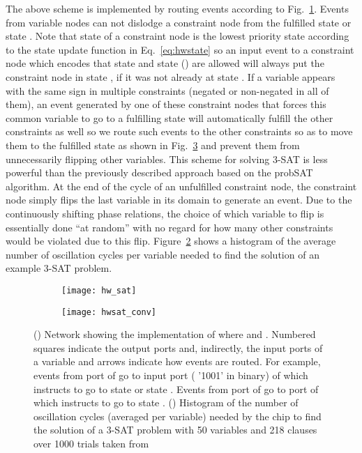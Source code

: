 \documentclass[10pt]{article}
\begin{document}
The above scheme is implemented by routing events according to Fig.~\ref{fig:hwsat_a}. Events from variable nodes can not dislodge a constraint node from the fulfilled state or state . Note that state  of a constraint node is the lowest priority state according to the state update function in Eq.~\ref{eq:hwstate} so an input event to a constraint node which encodes that state  and state  () are allowed will always put the constraint node in state , if it was not already at state . If a variable appears with the same sign in multiple constraints (negated or non-negated in all of them), an event generated by one of these constraint nodes that forces this common variable to go to a fulfilling state will automatically fulfill the other constraints as well so we route such events to the other constraints so as to move them to the fulfilled state as shown in Fig.~\ref{fig:hwsat} and prevent them from unnecessarily flipping other variables. This scheme for solving 3-SAT is less powerful than the previously described approach based on the probSAT algorithm. At the end of the cycle of an unfulfilled constraint node, the constraint node simply flips the last variable in its domain to generate an event. Due to the continuously shifting phase relations, the choice of which variable to flip is essentially done ``at random''  with no regard for how many other constraints would be violated due to this flip. Figure~\ref{fig:hwsat_b} shows a histogram of the average number of oscillation cycles per variable needed to find the solution of an example 3-SAT problem. 


\begin{figure}[h]
 \centering
 \begin{subfigure}[b]{0.4\textwidth}
     \texttt{[image: hw\_sat]} 
     \subcaption{}
     \label{fig:hwsat_a}
   \end{subfigure}
   \quad
   \begin{subfigure}[b]{0.5\textwidth}
     \texttt{[image: hwsat\_conv]} 
     \subcaption{}
     \label{fig:hwsat_b}
   \end{subfigure}


   \caption{() Network showing the implementation of  where  and . Numbered squares indicate the output ports and, indirectly, the input ports of a variable and arrows indicate how events are routed. For example, events from port  of  go to input port ( '1001' in binary) of  which instructs  to go to state  or state . Events from port  of  go to port  of  which instructs  to go to state . () Histogram of the number of oscillation cycles (averaged per variable) needed by the chip to find the solution of a 3-SAT problem with 50 variables and 218 clauses over 1000 trials taken from \cite{Hoos_Stutzle98}}
\label{fig:hwsat}
\end{figure}	
\end{document}
